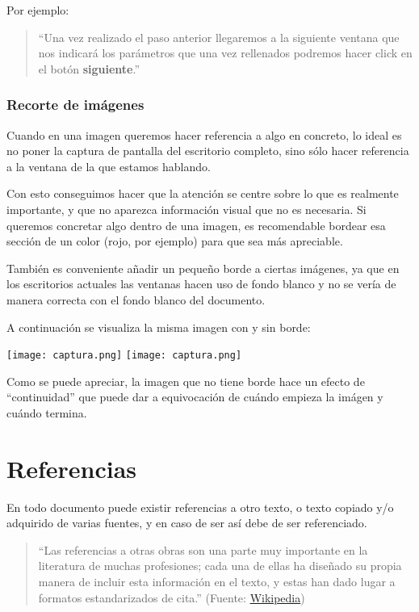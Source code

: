 Por ejemplo:

\begin{quote}
“Una vez realizado el paso anterior llegaremos a la siguiente ventana que nos indicará los parámetros que una vez rellenados podremos hacer click en el botón \textbf{siguiente}.”
\end{quote}

\subsection{Recorte de imágenes}
Cuando en una imagen queremos hacer referencia a algo en concreto, lo ideal es no poner la captura de pantalla del escritorio completo, sino sólo hacer referencia a la ventana de la que estamos hablando.

Con esto conseguimos hacer que la atención se centre sobre lo que es realmente importante, y que no aparezca información visual que no es necesaria. Si queremos concretar algo dentro de una imagen, es recomendable bordear esa sección de un color (rojo, por ejemplo) para que sea más apreciable.

También es conveniente añadir un pequeño borde a ciertas imágenes, ya que en los escritorios actuales las ventanas hacen uso de fondo blanco y no se vería de manera correcta con el fondo blanco del documento.

A continuación se visualiza la misma imagen con y sin borde:

\begin{center}
    \texttt{[image: captura.png]}
    \hfill
    \texttt{[image: captura.png]}
\end{center}

Como se puede apreciar, la imagen que no tiene borde hace un efecto de “continuidad” que puede dar a equivocación de cuándo empieza la imágen y cuándo termina.



\chapter{Referencias}
En todo documento puede existir referencias a otro texto, o texto copiado y/o adquirido de varias fuentes, y en caso de ser así debe de ser referenciado.

\vspace{-10pt}
\begin{quote}
    “Las referencias a otras obras son una parte muy importante en la literatura de muchas profesiones; cada una de ellas ha diseñado su propia manera de incluir esta información en el texto, y estas han dado lugar a formatos estandarizados de cita.” (Fuente: \href{https://es.wikipedia.org/wiki/Wikipedia:Referencias}{Wikipedia})
\end{quote}


